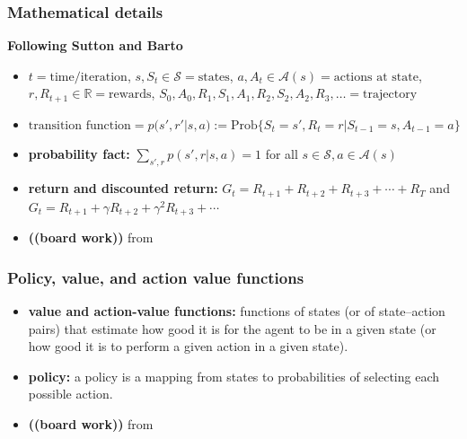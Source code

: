 \documentclass{beamer}
\begin{document}
\begin{frame}
  \frametitle{Mathematical details \cite{Sutton2018}}
  {\bf Following Sutton and Barto \cite{Sutton2018}}
  \begin{itemize}
  \item $t=\text{time/iteration}$, $s, S_t \in \mathcal{S} = \text{states}$, $a, A_t \in \mathcal{A}(s) = \text{actions at state}$, $r, R_{t+1} \in \mathbb{R} = \text{rewards}$,
    $S_0, A_0, R_1, S_1, A_1, R_2, S_2, A_2, R_3, \ldots = \text{trajectory}$
  \item $\text{transition function} = p(s', r'| s, a) := \text{Prob}\{S_t = s', R_t = r | S_{t-1} = s, A_{t-1} = a\}$
  \item {\bf probability fact:} $\sum_{s',r} p(s',r | s, a) = 1$ for all $s \in \mathcal{S}, a \in \mathcal{A}(s)$
  \item {\bf return and discounted return:} $G_t = R_{t+1} + R_{t+2} + R_{t+3} + \cdots + R_{T}$ and $G_t = R_{t+1} + \gamma R_{t+2} + \gamma^2 R_{t+3} + \cdots$
  \item {\bf ((board work))} from \cite{Sutton2018}
  \end{itemize}
\end{frame}

\begin{frame}
  \frametitle{Policy, value, and action value functions}
  \begin{itemize}
  \item {\bf value and action-value functions:} functions of states (or of state–action pairs) that estimate how good it is for the agent to be in a
    given state (or how good it is to perform a given action in a given state).
  \item {\bf policy:} a policy is a mapping from states to probabilities of selecting each possible action.
  \item {\bf ((board work))} from \cite{Sutton2018}
  \end{itemize}
\end{frame}
\end{document}
